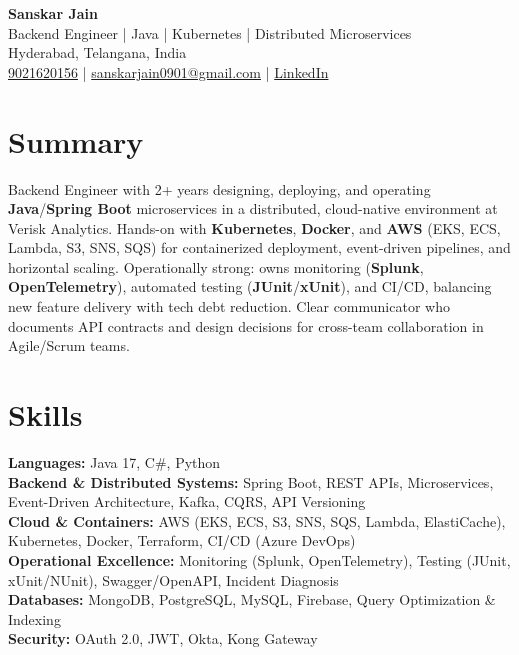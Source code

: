 \documentclass[a4paper,10pt]{article}
\begin{document}
\begin{center}
    {\LARGE \textbf{Sanskar Jain}} \\
    Backend Engineer \;|\; Java \;|\; Kubernetes \;|\; Distributed Microservices \\
    Hyderabad, Telangana, India \\
    \href{tel:9021620156}{9021620156} \;|\;
    \href{mailto:sanskarjain0901@gmail.com}{sanskarjain0901@gmail.com} \;|\;
    \href{https://www.linkedin.com/in/sanskar-jain0901/}{LinkedIn}
\end{center}

\vspace{3pt}

\section*{Summary}
Backend Engineer with 2+ years designing, deploying, and operating \textbf{Java}/\textbf{Spring Boot} microservices in a distributed, cloud-native environment at Verisk Analytics.
Hands-on with \textbf{Kubernetes}, \textbf{Docker}, and \textbf{AWS} (EKS, ECS, Lambda, S3, SNS, SQS) for containerized deployment, event-driven pipelines, and horizontal scaling.
Operationally strong: owns monitoring (\textbf{Splunk}, \textbf{OpenTelemetry}), automated testing (\textbf{JUnit}/\textbf{xUnit}), and CI/CD, balancing new feature delivery with tech debt reduction.
Clear communicator who documents API contracts and design decisions for cross-team collaboration in Agile/Scrum teams.

\section*{Skills}
\textbf{Languages:} Java 17, C\#, Python \\
\textbf{Backend \& Distributed Systems:} Spring Boot, REST APIs, Microservices, Event-Driven Architecture, Kafka, CQRS, API Versioning \\
\textbf{Cloud \& Containers:} AWS (EKS, ECS, S3, SNS, SQS, Lambda, ElastiCache), Kubernetes, Docker, Terraform, CI/CD (Azure DevOps) \\
\textbf{Operational Excellence:} Monitoring (Splunk, OpenTelemetry), Testing (JUnit, xUnit/NUnit), Swagger/OpenAPI, Incident Diagnosis \\
\textbf{Databases:} MongoDB, PostgreSQL, MySQL, Firebase, Query Optimization \& Indexing \\
\textbf{Security:} OAuth 2.0, JWT, Okta, Kong Gateway
\end{document}
